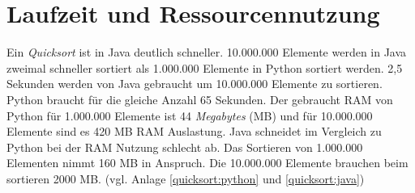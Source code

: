 \section{Laufzeit und Ressourcennutzung}
Ein \textit{Quicksort} ist in Java deutlich schneller. 10.000.000 Elemente werden in Java zweimal schneller sortiert als 1.000.000 Elemente in Python sortiert werden. 2,5 Sekunden werden von Java gebraucht um 10.000.000 Elemente zu sortieren. Python braucht für die gleiche Anzahl 65 Sekunden. Der gebraucht RAM von Python für 1.000.000 Elemente ist 44 \textit{Megabytes} (MB) und für 10.000.000 Elemente sind es 420 MB RAM Auslastung. Java schneidet im Vergleich zu Python bei der RAM Nutzung schlecht ab. Das Sortieren von 1.000.000 Elementen nimmt 160 MB in Anspruch. Die 10.000.000 Elemente brauchen beim sortieren 2000 MB. (vgl. Anlage \ref{quicksort:python} und \ref{quicksort:java})
